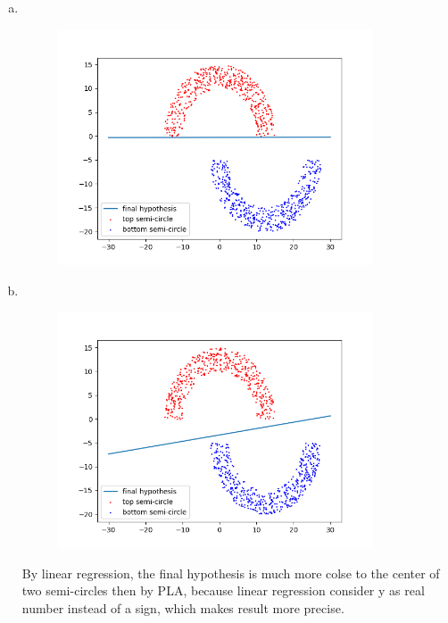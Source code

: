\documentclass[11pt]{article}
\begin{document}
\begin{enumerate} [(a)]
	\item \ \\
	\begin{figure}[htb]
		{\includegraphics[height=7cm]{p3_1_a.png}}
	\end{figure}
	\item \ \\
	\begin{figure}[htb]
		{\includegraphics[height=7cm]{p3_1_b.png}}
	\end{figure}

	By linear regression, the final hypothesis is much more colse to the center of two semi-circles then by PLA, because linear regression consider y as real number instead of a sign, which makes result more precise.
\end{enumerate}

\newpage
\end{document}
